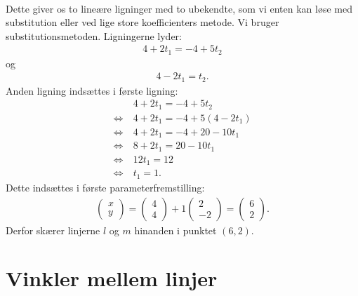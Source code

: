 \begin{exa}
\begin{align*}
	\end{align*}
	Dette giver os to lineære ligninger med to ubekendte, som vi enten kan løse med 
	substitution eller ved lige store koefficienters metode. Vi bruger substitutionsmetoden. 
	Ligningerne lyder:
	\begin{align*}
		4 + 2t_1 = -4+5t_2
	\end{align*} og
	\begin{align*}
		4-2t_1 = t_2.
	\end{align*}
	Anden ligning indsættes i første ligning:
	\begin{align*}
		&4 + 2t_1 = -4+5t_2\\
		\Leftrightarrow \ &4 + 2t_1 = -4+5(4-2t_1)\\
		\Leftrightarrow \ &4+2t_1 = -4+20-10t_1\\
		\Leftrightarrow \ &8+2t_1 = 20-10t_1\\
		\Leftrightarrow \ &12t_1 = 12\\
		\Leftrightarrow \ &t_1 = 1.
	\end{align*}
	Dette indsættes i første parameterfremstilling:
	\begin{align*}
		\begin{pmatrix}
			x \\ y
		\end{pmatrix} = 
		\begin{pmatrix}
			4 \\ 4 
		\end{pmatrix} 
		+ 1
		\begin{pmatrix}
			2 \\ -2
		\end{pmatrix} = 
		\begin{pmatrix}
			6 \\ 2
		\end{pmatrix}.
	\end{align*}
	Derfor skærer linjerne $l$ og $m$ hinanden i punktet $(6,2)$. 
\end{exa}

\section*{Vinkler mellem linjer}


